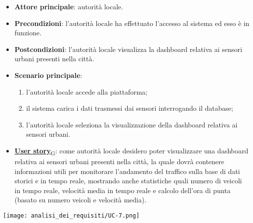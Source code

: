 \begin{itemize}
	\item \textbf{Attore principale}: autorità locale.
	\item \textbf{Precondizioni}: l'autorità locale ha effettuato l'accesso al sistema ed esso è in funzione.
	\item \textbf{Postcondizioni}: l'autorità locale visualizza la dashboard relativa
	      ai sensori urbani presenti nella città.
	\item \textbf{Scenario principale}:
	      \begin{enumerate}
		      \item l'autorità locale accede alla piattaforma;
		      \item il sistema carica i dati trasmessi dai sensori interrogando il database;
		      \item l'autorità locale seleziona la visualizzazione della dashboard relativa ai sensori urbani.
	      \end{enumerate}
	\item \href{https://7last.github.io/docs/rtb/documentazione-interna/glossario\#user-story}{\textbf{User story}\textsubscript{G}}:
	      come autorità locale desidero poter visualizzare una dashboard relativa ai sensori urbani presenti nella città, la quale
	      dovrà contenere informazioni utili per monitorare l'andamento del traffico sulla base di dati storici e in tempo reale, mostrando
	      anche statistiche quali numero di veicoli in tempo reale, velocità media in tempo reale e calcolo dell'ora di punta (basato su numero veicoli e velocità media).
\end{itemize}
\begin{center}
	\texttt{[image: analisi\_dei\_requisiti/UC-7.png]}
\end{center}


